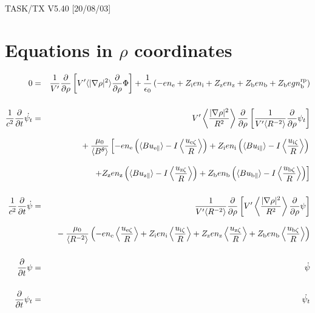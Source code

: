 \documentclass[11pt]{article}
\def\r#1{{\rm#1}}
\def\ave#1{\left\langle#1\right\rangle}
\def\aves#1{\langle#1\rangle}
\def\para{\parallel}
\def\ddrho{\frac{\partial}{\partial\rho}}
\def\ddt{\frac{\partial}{\partial t}}
\def\gradrho2{\aves{|\nabla\rho|^2}}
\def\psid{\dot{\psi}}
\def\psit{\psi_t}
\def\psitd{\dot{\psit}}
\def\nee{n_\r{e}}
\def\ni{n_\r{i}}
\def\nz{n_\r{z}}
\def\nb{n_\r{b}}
\def\Zi{Z_\r{i}}
\def\Zz{Z_\r{z}}
\def\Zb{Z_\r{b}}
\def\uzt#1{u_{\r{#1}\zeta}}
\def\upara#1{u_{\r{#1}\para}}
\def\nbrp{n_\r{b}^\r{rp}}
\begin{document}
\begin{center}
TASK/TX V5.40 [20/08/03]
\end{center}

\section{Equations in $\rho$ coordinates}
\vspace{-5mm}

%
\begin{eqnarray}
  0 &=&
%
    \frac{1}{V'} \ddrho \left[ V' \gradrho2 \ddrho{\Phi} \right]
%
  + \frac{1}{\epsilon_0}
%
    \left(-e \nee + \Zi e \ni + \Zz e \nz + \Zb e \nb + \Zb e g \nbrp \right)
\\[5mm]
  \frac{1}{c^2} \ddt \psitd &=&
%
    V' \ave{\frac{|\nabla\rho|^2}{R^2}} \ddrho \left[ \frac{1}{V'\aves{R^{-2}}}
				         \ddrho \psit \right] \nonumber\\[3mm]&&{}
%
  + \frac{\mu_0}{\aves{B^\theta}}
%
    \left[-     e \nee \left( \aves{B\upara{e}} - I\ave{\frac{\uzt{e}}{R}} \right)
          + \Zi e \ni  \left( \aves{B\upara{i}} - I\ave{\frac{\uzt{i}}{R}} \right)
    \right.\nonumber\\[3mm]&&{}
    \left.+ \Zz e \nz  \left( \aves{B\upara{z}} - I\ave{\frac{\uzt{z}}{R}} \right)
          + \Zb e \nb  \left( \aves{B\upara{b}} - I\ave{\frac{\uzt{b}}{R}} \right) \right]
\\[5mm]
  \frac{1}{c^2} \ddt \psid &=&
%
  \frac{1}{V'\aves{R^{-2}}} \ddrho \left[ V'
				    \ave{\frac{|\nabla\rho|^2}{R^2}}
				    \ddrho \psi \right] \nonumber\\[3mm]&&{}
%
  - \frac{\mu_0}{\aves{R^{-2}}} \left(-e \nee \ave{\frac{\uzt{e}}{R}}
			         + \Zi e \ni  \ave{\frac{\uzt{i}}{R}}
			         + \Zz e \nz  \ave{\frac{\uzt{z}}{R}}
			         + \Zb e \nb  \ave{\frac{\uzt{b}}{R}} \right)
%
\\[5mm]
  \ddt \psi &=&
%
  \psid
\\[5mm]
  \ddt \psit &=&
%
  \psitd
\end{eqnarray}
%

\end{document}
